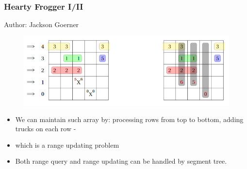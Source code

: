 \documentclass{beamer}
\begin{document}
\begin{frame}
  \frametitle{Hearty Frogger I/II}
Author: Jackson Goerner
 \begin{figure}[]
  \centering
  \includegraphics[width=.9\textwidth]{Shifting.png}  
\end{figure} 
\begin{itemize}
  \item \small We can maintain such array by: processing rows from top to bottom, adding trucks on each row -
  \item \small which is a range updating problem
  \item \small Both range query and range updating can be handled by segment tree.
\end{itemize}
\end{frame}

\end{document}
